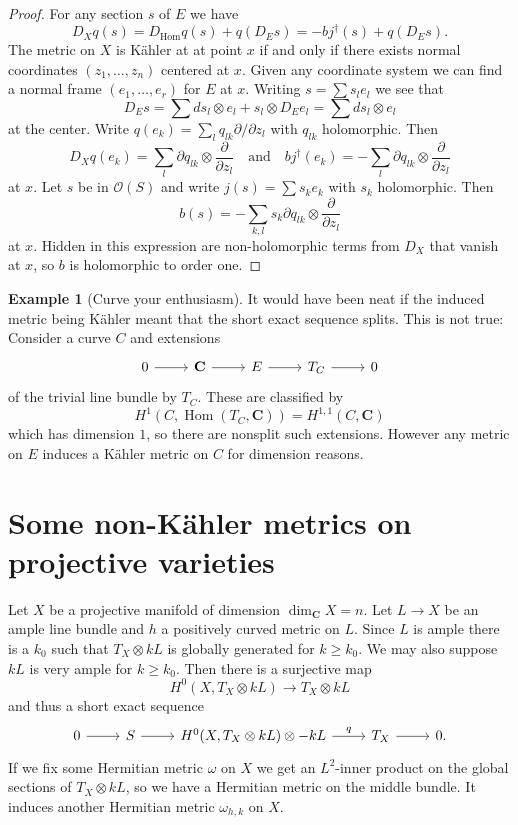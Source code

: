 \documentclass[12pt]{amsart}
\theoremstyle{definition}
\newtheorem{exam}[theo]{Example}
\newcommand{\cc}[1]{\mathcal{#1}}
\def\qandq{\quad\text{and}\quad}
\def\CC{\mathbf{C}}
\DeclareMathOperator{\Hom}{Hom}
\begin{document}
\begin{proof}
For any section $s$ of $E$ we have 
\[
D_X q(s)
= D_{\Hom}q(s) + q(D_E s)
= - b j^\dagger(s) + q(D_E s).
\]
The metric on $X$ is K\"ahler at at point $x$ if and only if there exists normal coordinates $(z_1,\ldots,z_n)$ centered at $x$.
Given any coordinate system we can find a normal frame $(e_1,\ldots,e_r)$ for $E$ at $x$.
Writing $s = \sum s_l e_l$ we see that
\[
D_E s 
= \sum ds_l \otimes e_l + s_l \otimes D_E e_l
= \sum ds_l \otimes e_l
\]
at the center.
Write $q(e_k) = \sum_l q_{lk} \partial / \partial z_l$ with $q_{lk}$ holomorphic.
Then
\[
D_X q(e_k)
= \sum_l \partial q_{lk} \otimes \frac{\partial}{\partial z_l}
\qandq
b j^\dagger(e_k)
= -\sum_l \partial q_{lk} \otimes \frac{\partial}{\partial z_l}
\]
at $x$.
Let $s$ be in $\cc O(S)$ and write $j(s) = \sum s_k e_k$ with $s_k$ holomorphic.
Then
\[
b(s)
= -\sum_{k,l} s_k \partial q_{lk} \otimes \frac{\partial}{\partial z_l}
\]
at $x$.
Hidden in this expression are non-holomorphic terms from $D_X$ that vanish at $x$, so $b$ is holomorphic to order one.
\end{proof}



\begin{exam}[Curve your enthusiasm]
It would have been neat if the induced metric being K\"ahler meant that the short exact sequence splits.
This is not true:
Consider a curve $C$ and extensions
\[
\begin{tikzcd}
0 \ar[r] &
\CC \ar[r] &
E \ar[r] &
T_C \ar[r] &
0
\end{tikzcd}
\]
of the trivial line bundle by $T_C$.
These are classified by 
\[
H^1(C, \Hom(T_C, \CC)) = H^{1,1}(C,\CC)
\]
which has dimension $1$, so there are nonsplit such extensions.
However any metric on $E$ induces a K\"ahler metric on $C$ for dimension reasons.
\end{exam}




\section{Some non-K\"ahler metrics on projective varieties}

Let $X$ be a projective manifold of dimension $\dim_{\CC} X = n$.
Let $L \to X$ be an ample line bundle and $h$ a positively curved metric on $L$.
Since $L$ is ample there is a $k_0$ such that $T_X \otimes kL$ is globally generated for $k \geq k_0$.
We may also suppose $kL$ is very ample for $k \geq k_0$.
Then there is a surjective map
\[
H^0(X, T_X \otimes kL) 
\longrightarrow T_X \otimes kL
\]
and thus a short exact sequence
\[
\begin{tikzcd}
0 \ar[r] &
S \ar[r] &
H^0(X, T_X \otimes kL) \otimes -kL \ar[r,"q"] &
T_X \ar[r] &
0.
\end{tikzcd}
\]
If we fix some Hermitian metric $\omega$ on $X$ we get an $L^2$-inner product on the global sections of $T_X \otimes kL$, so we have a Hermitian metric on the middle bundle.
It induces another Hermitian metric $\omega_{h,k}$ on $X$.
\end{document}
